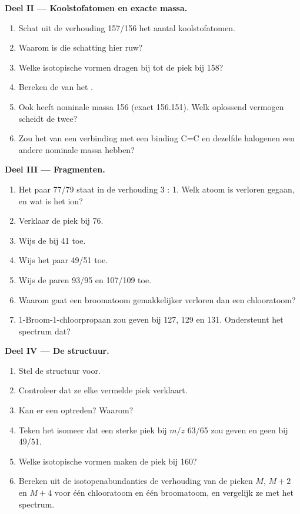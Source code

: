 \begin{problem}
\medskip
\noindent\textbf{Deel II --- Koolstofatomen en exacte massa.}
\begin{enumerate}[resume]
  \item Schat uit de verhouding 157/156 het aantal koolstofatomen.
  \item Waarom is die schatting hier ruw?
  \item Welke isotopische vormen dragen bij tot de piek bij 158?
  \item Bereken de  van het .
  \item Ook  heeft nominale massa 156 (exact 156.151). Welk oplossend vermogen scheidt de
        twee?
  \item Zou het  van een verbinding met een binding C=C en dezelfde halogenen een andere
        nominale massa hebben?
\end{enumerate}

\medskip
\noindent\textbf{Deel III --- Fragmenten.}
\begin{enumerate}[resume]
  \item Het paar 77/79 staat in de verhouding 3 : 1. Welk atoom is verloren gegaan, en wat is het ion?
  \item Verklaar de piek bij 76.
  \item Wijs de  bij 41 toe.
  \item Wijs het paar 49/51 toe.
  \item Wijs de paren 93/95 en 107/109 toe.
  \item Waarom gaat een broomatoom gemakkelijker verloren dan een chlooratoom?
  \item 1-Broom-1-chloorpropaan zou  geven bij 127, 129 en 131. Ondersteunt het spectrum dat?
\end{enumerate}

\medskip
\noindent\textbf{Deel IV --- De structuur.}
\begin{enumerate}[resume]
  \item Stel de structuur voor.
  \item Controleer dat ze elke vermelde piek verklaart.
  \item Kan er een  optreden? Waarom?
  \item Teken het isomeer dat een sterke piek bij $m/z$ 63/65 zou geven en geen bij 49/51.
  \item Welke isotopische vormen maken de piek bij 160?
  \item Bereken uit de isotopenabundanties de verhouding van de pieken $M$, $M+2$ en $M+4$ voor één
        chlooratoom en één broomatoom, en vergelijk ze met het spectrum.
\end{enumerate}
\end{problem}
